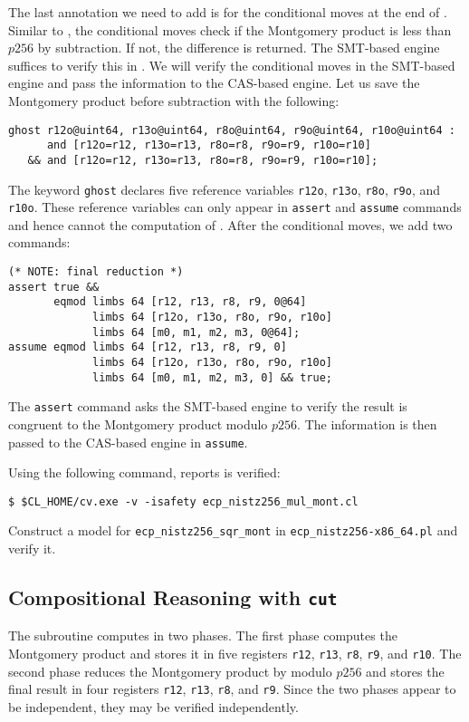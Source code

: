 \documentclass{amsproc}
\begin{document}
The last annotation we need to add is for the conditional moves at the
end of \nistzmul. Similar to \nistzadd, the conditional moves check if
the Montgomery product is less than $p256$ by subtraction. If not, the
difference is returned. The SMT-based engine suffices to verify this
in \nistzadd. We will verify the conditional moves in the SMT-based
engine and pass the information to the CAS-based engine. Let us save
the Montgomery product before subtraction with the following:
\begin{verbatim}
ghost r12o@uint64, r13o@uint64, r8o@uint64, r9o@uint64, r10o@uint64 :
      and [r12o=r12, r13o=r13, r8o=r8, r9o=r9, r10o=r10]
   && and [r12o=r12, r13o=r13, r8o=r8, r9o=r9, r10o=r10];
\end{verbatim}
The keyword \texttt{ghost} declares five reference variables
\texttt{r12o}, \texttt{r13o}, \texttt{r8o}, \texttt{r9o}, and
\texttt{r10o}. These reference variables can only appear in
\texttt{assert} and \texttt{assume} commands and hence cannot the
computation of \nistzmul. After the conditional moves, we add two
\cryptoline commands:
\begin{verbatim}
(* NOTE: final reduction *)
assert true &&
       eqmod limbs 64 [r12, r13, r8, r9, 0@64]
             limbs 64 [r12o, r13o, r8o, r9o, r10o]
             limbs 64 [m0, m1, m2, m3, 0@64];
assume eqmod limbs 64 [r12, r13, r8, r9, 0]
             limbs 64 [r12o, r13o, r8o, r9o, r10o]
             limbs 64 [m0, m1, m2, m3, 0] && true;
\end{verbatim}
The \texttt{assert} command asks the SMT-based engine to verify the
result is congruent to the Montgomery product modulo $p256$. The
information is then passed to the CAS-based engine in
\texttt{assume}. 

Using the following command, \cryptoline reports \nistzmul
is verified:
\begin{verbatim}
$ $CL_HOME/cv.exe -v -isafety ecp_nistz256_mul_mont.cl
\end{verbatim}

\exercise Construct a model for \texttt{ecp\_nistz256\_sqr\_mont} in 
\texttt{ecp\_nistz256-x86\_64.pl} and verify it.

\subsection{Compositional Reasoning with \texttt{cut}}

The \nistzmul subroutine computes in two phases. The first phase
computes the Montgomery product and stores it in five registers
\texttt{r12}, \texttt{r13}, \texttt{r8}, \texttt{r9}, and
\texttt{r10}. The second phase reduces the Montgomery product by
modulo $p256$ and stores the final result in four registers
\texttt{r12}, \texttt{r13}, \texttt{r8}, and \texttt{r9}. Since the
two phases appear to be independent, they may be verified
independently. 
\end{document}
